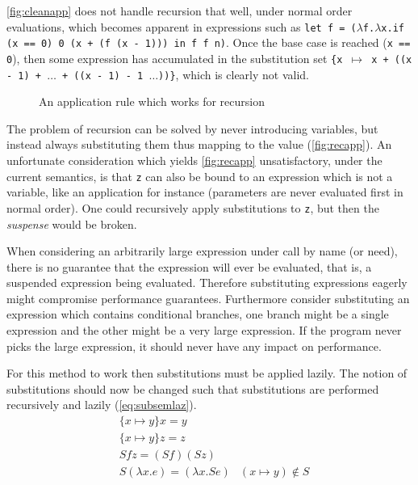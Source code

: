 \documentclass[11pt,oneside,a4paper]{report}
\begin{document}
\autoref{fig:cleanapp} does not handle recursion that well, under normal order evaluations, which becomes apparent in expressions such as \texttt{let f = ($\lambda$f.$\lambda$x.if (x == 0) 0 (x + (f (x - 1))) in f f n)}.
Once the base case is reached (\texttt{x == 0}), then some expression has accumulated in the substitution set \texttt{\{x $\mapsto$ x + ((x - 1) + $\dots$ + ((x - 1) - 1 $\dots$))\}}, which is clearly not valid.
\begin{figure}[ht]
    \begin{mdframed}[style=style1]
        \vspace*{0.4cm}
          \begin{prooftree}
          \end{prooftree}   
    \end{mdframed}
    \caption{An application rule which works for recursion}
    \label{fig:recapp}
\end{figure}
\noindent The problem of recursion can be solved by never introducing variables, but instead always substituting them thus mapping to the value (\autoref{fig:recapp}).
An unfortunate consideration which yields \autoref{fig:recapp} unsatisfactory, under the current semantics, is that \texttt{z} can also be bound to an expression which is not a variable, like an application for instance (parameters are never evaluated first in normal order).
One could recursively apply substitutions to \texttt{z}, but then the \textit{suspense} would be broken.
\begin{remark}
  When considering an arbitrarily large expression under call by name (or need), there is no guarantee that the expression will ever be evaluated, that is, a suspended expression being evaluated.
  Therefore substituting expressions eagerly might compromise performance guarantees.
  Furthermore consider substituting an expression which contains conditional branches, one branch might be a single expression and the other might be a very large expression.
  If the program never picks the large expression, it should never have any impact on performance.
\end{remark}
\noindent For this method to work then substitutions must be applied lazily.
The notion of substitutions should now be changed such that substitutions are performed recursively and lazily (\autoref{eq:subsemlaz}).
\begin{align}
  &\{ x \mapsto y \} x = y &\label{eq:subsemlaz}\\
  &\{ x \mapsto y \} z = z  &\tag*{}\\
  &S f z = (Sf)(Sz) &\tag*{}\\
  &S (\lambda x.e) = (\lambda x.Se) & (x \mapsto y) \notin S \tag*{}%
\end{align}
\end{document}
